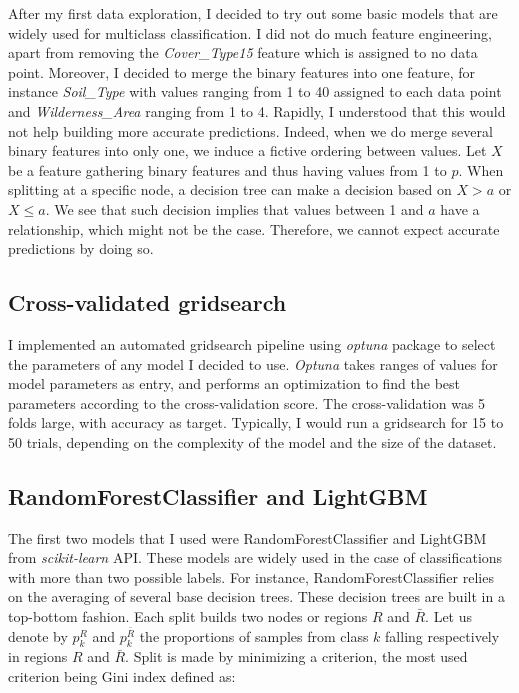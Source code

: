 \documentclass{article}
\begin{document}
\begin{multicols}{2}
After my first data exploration, I decided to try out some basic
models that are widely used for multiclass classification. I did not
do much feature engineering, apart from removing the \textit{Cover\_Type15}
feature which is assigned to no data point. Moreover, I decided to
merge the binary features into one feature, for instance
\textit{Soil\_Type} with values ranging from 1 to 40 assigned to each
data point and \textit{Wilderness\_Area} ranging from 1 to 4. Rapidly,
I understood that this would not help building more accurate predictions.
Indeed, when we do merge several binary features into only one, we
induce a fictive ordering between values. Let $X$ be a feature gathering
binary features and thus having values from 1 to $p$. When splitting
at a specific node,
a decision tree can make a decision based on $X > a$ or $X \leq a$.
We see that such decision implies that values between 1 and $a$ have
a relationship, which might not be the case. Therefore, we cannot
expect accurate predictions by doing so.

\subsection{Cross-validated gridsearch}

I implemented an automated gridsearch pipeline
using \textit{optuna} package to select the parameters of any model
I decided to use. \textit{Optuna}\cite{optuna} takes ranges of values for
model parameters as entry, and performs an optimization to find the best
parameters according to the cross-validation score. The cross-validation
was 5 folds large, with accuracy as target. Typically, I would run a
gridsearch for 15 to 50 trials, depending on the complexity of the model
and the size of the dataset.

\subsection{RandomForestClassifier and LightGBM}

The first two models that I used were RandomForestClassifier and
LightGBM\cite{lightgbm}
from \textit{scikit-learn}\cite{sklearn} API.
These models are widely used in the case of classifications with more
than two possible labels. For instance, RandomForestClassifier relies on
the averaging of several base decision trees. These decision
trees are built in a top-bottom fashion. Each split builds two nodes or
regions $R$ and $\bar{R}$. Let us denote by $p^{R}_k$ and $p^{\bar{R}}_k$
the proportions of samples from class $k$ falling respectively in regions
$R$ and $\bar{R}$. Split is made by minimizing a criterion, the most used
criterion being Gini index defined as:


\end{multicols}
\end{document}
